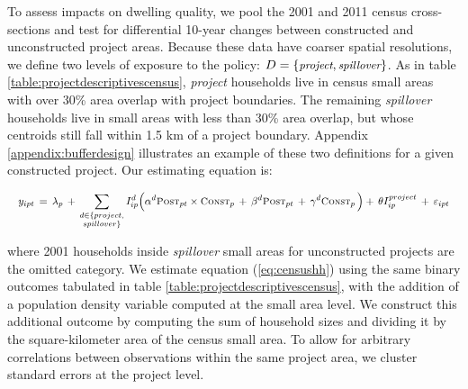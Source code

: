 \documentclass[12pt]{article}
\begin{document}
To assess impacts on dwelling quality, we pool the 2001 and 2011 census cross-sections and test for differential 10-year changes between constructed and unconstructed project areas. Because these data have coarser spatial resolutions, we define two levels of exposure to the policy: $D=\{\text{\small\it project},\text{\small\it spillover}\}$. As in table \ref{table:projectdescriptivescensus}, {\it project} households live in census small areas with over 30\% area overlap with project boundaries. The remaining {\it spillover} households live in small areas with less than 30\% area overlap, but whose centroids still fall within 1.5 km of a project boundary. Appendix \ref{appendix:bufferdesign} illustrates an example of these two definitions for a given constructed project. Our estimating equation is:

\vspace{-4mm}

\begin{equation}\label{eq:censushh}
\quad y_{ipt} \, = \, \lambda_{p} \,+\, \sum\limits_{\substack{d\in \{project,\\ spillover\}}} I^d_{ip}\Big( \alpha^d \textsc{\small Post}_{pt}\times\textsc{\small Const}_{p} \, + \, \beta^d\textsc{\small Post}_{pt} \, + \, \gamma^d\textsc{\small Const}_{p} \,\Big) + \, \theta I^{project}_{ip} \, +  \, \varepsilon_{ipt} \quad 
\end{equation}

\noindent where 2001 households inside {\it spillover} small areas for unconstructed projects are the omitted category. We estimate equation (\ref{eq:censushh}) using the same binary outcomes tabulated in table \ref{table:projectdescriptivescensus}, with the addition of a population density variable computed at the small area level. We construct this additional outcome by computing the sum of household sizes  and dividing it by the square-kilometer area of the census small area. To allow for arbitrary correlations between observations within the same project area, we cluster standard errors at the project level. 
\end{document}
